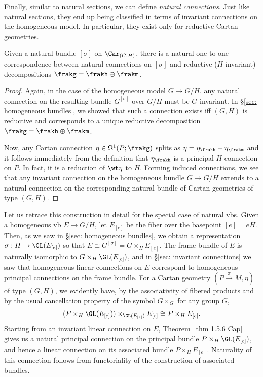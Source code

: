 Finally, similar to natural sections, we can define \emph{natural connections}. Just like natural sections, they end up being classified in terms of invariant connections on the homogeneous model. In particular, they exist only for reductive Cartan geometries.

\begin{prop}
    Given a natural bundle $[\sigma]$ on $\Car_{(G,H)}$, there is a natural one-to-one correspondence between natural connections on $[\sigma]$ and reductive ($H$-invariant) decompositions $\frakg=\frakh\oplus\frakm$.
\end{prop}
\begin{proof}
    Again, in the case of the homogeneous model $G\to G\slash H$, any natural connection on the resulting bundle $G^{[\sigma]}$ over $G\slash H$ must be $G$-invariant. 
    In \S\ref{sec: homogeneous bundles}, we showed that such a connection exists iff $(G,H)$ is reductive and corresponds to a unique reductive decomposition $\frakg=\frakh\oplus\frakm$.  
    
    Now, any Cartan connection $\eta\in\Omega^1(P;\frakg)$ splits as $\eta=\eta_\frakh+\eta_\frakm$ and it follows immediately from the definition that $\eta_\frakh$ is a principal $H$-connection on $P$. In fact, it is a reduction of $\wt\eta$ to $H$. Forming induced connections, we see that any invariant connection on the homogeneous bundle $G\to G\slash H$ extends to a natural connection on the corresponding natural bundle of Cartan geometries of type $(G,H)$.
\end{proof}


Let us retrace this construction in detail for the special case of natural \glspl{vb}. Given a homogeneous \gls{vb} $E\to G\slash H$, let $E_{[e]}$ be the fiber over the basepoint $[e]=eH$. Then, as we saw in \S\ref{sec: homogeneous bundles}, we obtain a representation $\sigma:H\to \GL(E_{[e]})$ so that $E\cong G^{[\sigma]}=G\times_H E_{[e]}$. The frame bundle of $E$ is naturally isomorphic to $G\times_H \GL(E_{[e]})$, and in \S\ref{sec: invariant connections} we saw that homogeneous linear connections on $E$ correspond to homogeneous principal connections on the frame bundle.  For a Cartan geometry $(P\overset{\pi}{\to} M,\eta)$ of type $(G,H)$, we evidently have, by the associativity of fibered products and by the usual cancellation property of the symbol $G\times_G $ for any group $G$,
\[(P\times_H\GL(E_{[e]}))\times_{\GL(E_{[e]})}E_{[e]}\cong P\times_H E_{[e]}.\]
Starting from an invariant linear connection on $E$, Theorem~\ref{thm 1.5.6 Cap} gives us a natural principal connection on the principal bundle $P\times_H \GL(E_{[e]})$, and hence a linear connection on its associated bundle $P\times_H E_{[e]}$. Naturality of this connection follows from functoriality of the construction of associated bundles.








